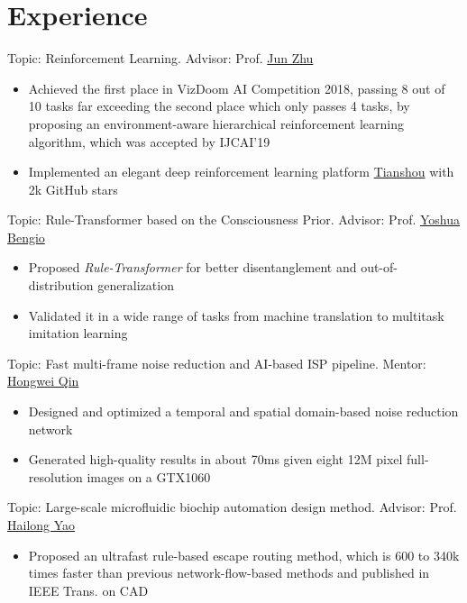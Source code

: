 \documentclass{resume}
\begin{document}
\section{Experience}
Topic: Reinforcement Learning. Advisor: Prof. \href{http://ml.cs.tsinghua.edu.cn/~jun/index.shtml}{Jun Zhu}
\begin{itemize}
\item Achieved the first place in VizDoom AI Competition 2018, passing 8 out of 10 tasks far exceeding the second place which only passes 4 tasks, by proposing an environment-aware hierarchical reinforcement learning algorithm, which was accepted by IJCAI'19
\item Implemented an elegant deep reinforcement learning platform \href{https://github.com/thu-ml/tianshou}{Tianshou} with 2k GitHub stars
\end{itemize}

Topic: Rule-Transformer based on the Consciousness Prior. Advisor: Prof. \href{https://mila.quebec/en/yoshua-bengio/}{Yoshua Bengio}
\begin{itemize}
    \item Proposed \textit{Rule-Transformer} for better disentanglement and out-of-distribution generalization
    \item Validated it in a wide range of tasks from machine translation to multitask imitation learning
\end{itemize}

Topic: Fast multi-frame noise reduction and AI-based ISP pipeline. Mentor: \href{http://qinhongwei.com/academic/}{Hongwei Qin}
\begin{itemize}
    \item Designed and optimized a temporal and spatial domain-based noise reduction network
    \item Generated high-quality results in about 70ms given eight 12M pixel full-resolution images on a GTX1060
\end{itemize}

Topic: Large-scale microfluidic biochip automation design method. Advisor: Prof. \href{http://biocad.cs.tsinghua.edu.cn/static/hailongyao.html}{Hailong Yao}
\begin{itemize}
\item Proposed an ultrafast rule-based escape routing method, which is 600 to 340k times faster than previous network-flow-based methods and published in IEEE Trans. on CAD
\end{itemize}
\end{document}
